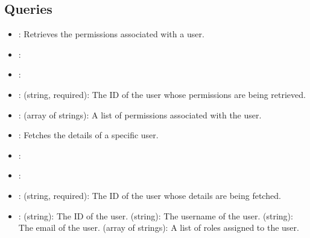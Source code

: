 \documentclass[letterpaper,10pt,english]{sphinxmanual}
\begin{document}
\subsection{Queries}
\label{\detokenize{administration_concession_system/authorization_service:queries}}
\sphinxAtStartPar
{}
\begin{itemize}
\item {} 
\sphinxAtStartPar
{}: Retrieves the permissions associated with a user.

\item {} 
\sphinxAtStartPar
{}: 

\item {} 
\sphinxAtStartPar
{}: 

\item {} 
\sphinxAtStartPar
{}:
\sphinxhyphen{}  (string, required): The ID of the user whose permissions are being retrieved.

\item {} 
\sphinxAtStartPar
{}:
\sphinxhyphen{}  (array of strings): A list of permissions associated with the user.

\end{itemize}

\sphinxAtStartPar
{}
\begin{itemize}
\item {} 
\sphinxAtStartPar
{}: Fetches the details of a specific user.

\item {} 
\sphinxAtStartPar
{}: 

\item {} 
\sphinxAtStartPar
{}: 

\item {} 
\sphinxAtStartPar
{}:
\sphinxhyphen{}  (string, required): The ID of the user whose details are being fetched.

\item {} 
\sphinxAtStartPar
{}:
\sphinxhyphen{}  (string): The ID of the user.
\sphinxhyphen{}  (string): The username of the user.
\sphinxhyphen{}  (string): The email of the user.
\sphinxhyphen{}  (array of strings): A list of roles assigned to the user.

\end{itemize}
\end{document}
